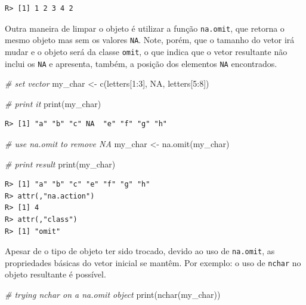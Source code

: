 \documentclass[
  11pt,
]{book}
\newenvironment{Shaded}{\begin{snugshade}}{\end{snugshade}}
\newcommand{\CommentTok}[1]{\textcolor[rgb]{0.37,0.37,0.37}{\textit{#1}}}
\newcommand{\ConstantTok}[1]{\textcolor[rgb]{0,0,0}{#1}}
\newcommand{\DecValTok}[1]{\textcolor[rgb]{0.06,0.06,0.06}{#1}}
\newcommand{\FunctionTok}[1]{\textcolor[rgb]{0,0,0}{#1}}
\newcommand{\NormalTok}[1]{#1}
\newcommand{\OtherTok}[1]{\textcolor[rgb]{0.37,0.37,0.37}{#1}}
\newcommand{\SpecialCharTok}[1]{\textcolor[rgb]{0,0,0}{#1}}
\begin{document}
\begin{verbatim}
R> [1] 1 2 3 4 2
\end{verbatim}

Outra maneira de limpar o objeto é utilizar a função \texttt{na.omit}, que retorna o mesmo objeto mas sem os valores \texttt{NA}. Note, porém, que o tamanho do vetor irá mudar e o objeto será da classe \texttt{omit}, o que indica que o vetor resultante não inclui os \texttt{NA} e apresenta, também, a posição dos elementos \texttt{NA} encontrados. 

\begin{Shaded}
\begin{Highlighting}[]
\CommentTok{\# set vector}
\NormalTok{my\_char }\OtherTok{\textless{}{-}} \FunctionTok{c}\NormalTok{(letters[}\DecValTok{1}\SpecialCharTok{:}\DecValTok{3}\NormalTok{], }\ConstantTok{NA}\NormalTok{, letters[}\DecValTok{5}\SpecialCharTok{:}\DecValTok{8}\NormalTok{])}

\CommentTok{\# print it}
\FunctionTok{print}\NormalTok{(my\_char)}
\end{Highlighting}
\end{Shaded}

\begin{verbatim}
R> [1] "a" "b" "c" NA  "e" "f" "g" "h"
\end{verbatim}

\begin{Shaded}
\begin{Highlighting}[]
\CommentTok{\# use na.omit to remove NA}
\NormalTok{my\_char }\OtherTok{\textless{}{-}} \FunctionTok{na.omit}\NormalTok{(my\_char)}

\CommentTok{\# print result}
\FunctionTok{print}\NormalTok{(my\_char)}
\end{Highlighting}
\end{Shaded}

\begin{verbatim}
R> [1] "a" "b" "c" "e" "f" "g" "h"
R> attr(,"na.action")
R> [1] 4
R> attr(,"class")
R> [1] "omit"
\end{verbatim}

Apesar de o tipo de objeto ter sido trocado, devido ao uso de \texttt{na.omit}, as propriedades básicas do vetor inicial se mantêm. Por exemplo: o uso de \texttt{nchar} no objeto resultante é possível.

\begin{Shaded}
\begin{Highlighting}[]
\CommentTok{\# trying nchar on a na.omit object}
\FunctionTok{print}\NormalTok{(}\FunctionTok{nchar}\NormalTok{(my\_char))}
\end{Highlighting}
\end{Shaded}
\end{document}
